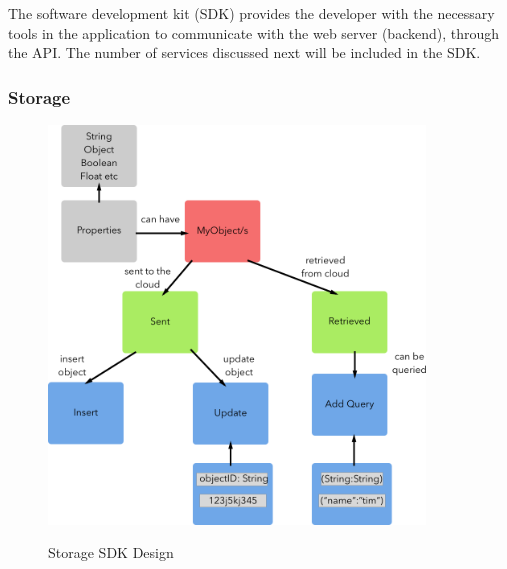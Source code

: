 The software development kit (SDK) provides the developer with the necessary tools in the application to communicate with the web server (backend), through the API. The number of services discussed next will be included in the SDK.

\subsubsection{Storage} \label{d-sdk:storage}


\begin{figure}[!h]
    \caption{Storage SDK Design}
    \centering
    \includegraphics[width=100mm]{images/design/objects}
    \label{fig:sdk_storage}
\end{figure}

